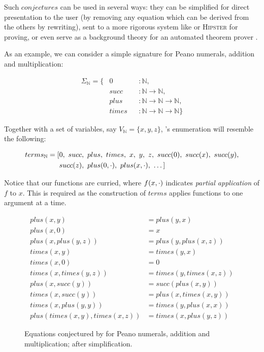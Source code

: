 Such $conjectures$ can be used in several ways: they can be simplified for direct presentation to the user (by removing any equation which can be derived from the others by rewriting), sent to a more rigorous system like \hspec{} or \textsc{Hipster} for proving, or even serve as a background theory for an automated theorem prover \citep{claessen2013automating}.

As an example, we can consider a simple signature for Peano numerals, addition and multiplication:

\begin{align*}
  \Sigma_{\mathbb{N}} = \{ & 0     && : \mathbb{N}, \\
                        & succ  && : \mathbb{N} \rightarrow \mathbb{N}, \\
                        & plus  && : \mathbb{N} \rightarrow \mathbb{N} \rightarrow \mathbb{N}, \\
                        & times && : \mathbb{N} \rightarrow \mathbb{N} \rightarrow \mathbb{N}\}
\end{align*}

Together with a set of variables, say $V_{\mathbb{N}} = \{x, y, z\}$, \qspec{}'s enumeration will resemble the following:

\begin{align*}
  terms_{\mathbb{N}} = [& 0,\ succ,\ plus,\ times,\ x,\ y,\ z,\ succ(0),\ succ(x),\ succ(y), \\
                     & succ(z),\ plus(0,\blank),\ plus(x, \blank),\ \dots ]
\end{align*}

Notice that our functions are curried, where $f(x,\cdot)$ indicates \emph{partial application} of $f$ to $x$. This is required as the construction of $terms$ applies functions to one argument at a time.

\begin{figure}
  \begin{align*}
                        plus(x, y) &= plus(y, x)            \\
                        plus(x, 0) &= x                     \\
               plus(x, plus(y, z)) &= plus(y, plus(x, z))   \\
                       times(x, y) &= times(y, x)           \\
                       times(x, 0) &= 0                     \\
             times(x, times(y, z)) &= times(y, times(x, z)) \\
                  plus(x, succ(y)) &= succ(plus(x, y))      \\
                 times(x, succ(y)) &= plus(x, times(x, y))  \\
              times(x, plus(y, y)) &= times(y, plus(x, x))  \\
    plus(times(x, y), times(x, z)) &= times(x, plus(y, z))
  \end{align*}
  \caption{Equations conjectured by \qspec{} for Peano numerals, addition and multiplication; after simplification.}
  \label{fig:qspecresult}
\end{figure}


